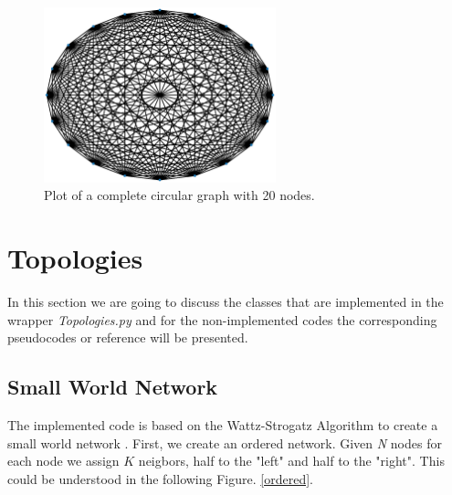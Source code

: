 \documentclass{article}
\begin{document}
\begin{figure}[H]
    \centering
    \includegraphics[width=0.6\textwidth]{completeGraph.eps}
    \caption{Plot of a complete circular graph with 20 nodes.}
    \label{circularGraph}
    
\end{figure}

\section{Topologies}

In this section we are going to discuss the classes that are implemented in the wrapper \textit{Topologies.py} and for the non-implemented codes the corresponding pseudocodes or reference will be presented. 

\subsection{Small World Network}

The implemented code is based on the Wattz-Strogatz Algorithm to create a small world network \cite{Watts1998}. First, we create an ordered network. Given \textit{N} nodes for each node we assign $K$ neigbors, half to the "left" and half to the "right". This could be understood in the following Figure. \ref{ordered}.
\end{document}
